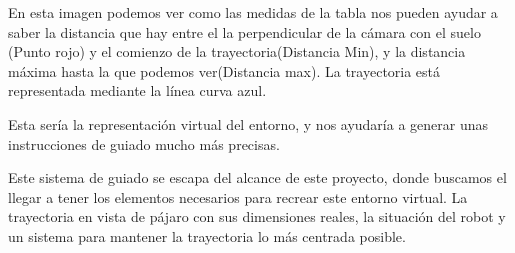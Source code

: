 En esta imagen podemos ver como las medidas de la tabla nos pueden ayudar a saber la distancia que hay entre el la perpendicular de la cámara con el suelo (Punto rojo) y el comienzo de la trayectoria(Distancia Min), y la distancia máxima hasta la que podemos ver(Distancia max). La trayectoria está representada mediante la línea curva azul.

Esta sería la representación virtual del entorno, y nos ayudaría a generar unas instrucciones de guiado mucho más precisas. 

Este sistema de guiado se escapa del alcance de este proyecto, donde buscamos el llegar a tener los elementos necesarios para recrear este entorno virtual. La trayectoria en vista de pájaro con sus dimensiones reales, la situación del robot y un sistema para mantener la trayectoria lo más centrada posible.
